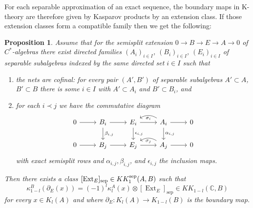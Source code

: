 \documentclass[12pt]{amsart}
\newtheorem{proposition}[theorem]{Proposition}
\newcommand{\CM}{{\mathbb C}}
\newcommand{\pdv}{\partial}
\DeclareMathOperator*{\Ext}{Ext}
\begin{document}
For each separable approximation of an exact sequence, the boundary maps in K-theory are therefore given by Kasparov products by an extension class. If those extension classes form a compatible family then we get the following:
\begin{proposition}
\label{prop:ext_boundarymap}
Assume that for the semisplit extension $0 \to B \to E \to A \to 0$ of $C^*$-algebras there exist directed families $(A_i)_{i\in I}$, $(B_i)_{i\in I}$, $(E_i)_{i\in I}$ of separable subalgebras indexed by the same directed set $i\in I$ such that
\begin{enumerate}
    \item[(i)] the nets are cofinal: for every pair $(A',B')$ of separable subalgebras $A'\subset A$, $B'\subset B$ there is some $i\in I$ with $A'\subset A_i$ and $B'\subset B_i$, and
    \item[(ii)] for each $i\prec j$ we have the commutative diagram 
\begin{equation}
\label{eq:comm_diag_i_to_j}
	\begin{tikzcd}
		0 \arrow[r] & B_i \arrow[r] \arrow[d, "\beta_{i,j}"] & E_i \arrow[r] \arrow[d, "\epsilon_{i,j}"] & A_i \arrow[bend right=33, "\sigma_i"]{l} \arrow[d,"\alpha_{i,j}"]  \arrow[r] & 0 \\
		 0 \arrow[r]  & B_j \arrow[r] & E_j \arrow[r] & A_j \arrow[bend right=33, "\sigma_j"]{l} \arrow[r] & 0
	\end{tikzcd}
\end{equation}
with exact semisplit rows and $\alpha_{i,j}, \beta_{i,j}$, and $\epsilon_{i,j}$ the inclusion maps.
\end{enumerate}  
Then there exists a class $[{\Ext}_{E}]_{\mathrm{sep}}\in  KK^{\rm sep}_1(A,B)$ such that
$$\kappa_{1-l}^B(\pdv_{E}(x)) = (-1)^{l}\kappa_l^A(x)\otimes [{\Ext}_{E}]_{\mathrm{sep}} \in KK_{1-l}(\CM, B)$$
for every $x\in K_l(A)$ and where $\pdv_{E}: K_l(A)\to K_{1-l}(B)$ is the boundary map.
\end{proposition}
\end{document}
